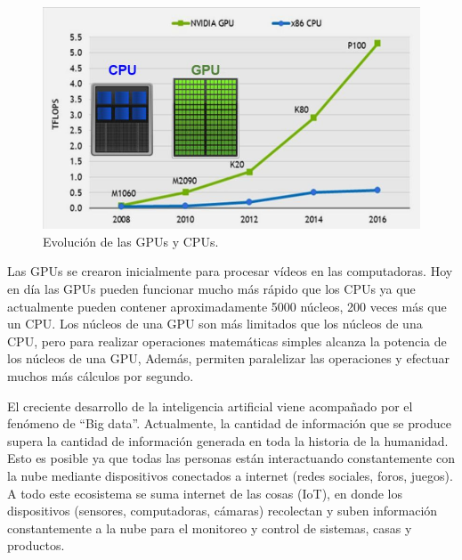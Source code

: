 \begin{figure}[ht]
	\centering
	\includegraphics[scale=.8]{./Figures/cpuGPU.jpg}
	\caption{Evolución de las GPUs y CPUs\protect\footnotemark.}
	\label{fig:cpuGPU}
\end{figure}


Las GPUs se crearon inicialmente para procesar vídeos en las computadoras.  Hoy en día las GPUs pueden funcionar mucho más rápido que los CPUs ya que actualmente pueden contener aproximadamente 5000 núcleos, 200 veces más que un CPU. Los núcleos de una GPU son más limitados que los núcleos de una CPU, pero para realizar operaciones matemáticas simples alcanza la potencia de los núcleos de una GPU, Además, permiten paralelizar las operaciones y efectuar muchos más cálculos por segundo.

El creciente desarrollo de la inteligencia artificial viene acompañado por el fenómeno de ``Big data''. Actualmente, la cantidad de información que se produce supera la cantidad de información generada en toda la historia de la humanidad. Esto es posible ya que todas las personas están interactuando constantemente con la nube mediante dispositivos conectados a internet (redes sociales, foros, juegos). A todo este ecosistema se suma internet de las cosas (IoT), en donde los dispositivos (sensores, computadoras, cámaras) recolectan y suben información constantemente a la nube para el monitoreo y control de sistemas, casas y productos.

\newpage


